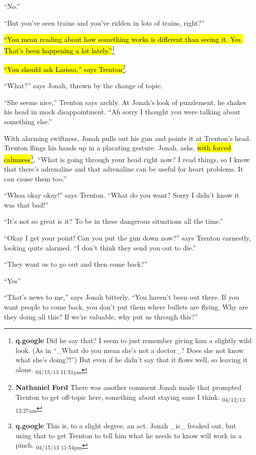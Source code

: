 ``No.''

``But you've seen trains and you've ridden in lots of trains, right?''

\hl{``You mean reading about how something works is different than seeing it.  Yes.  That's been happening a lot lately.''}\footnote{\textbf{q.google }Did he say that?  I seem to just remember giving him a slightly wild look.  (As in ``\_What do you mean she's not a doctor\_?  Does she not know what she's doing?!'')   But even if he didn't say that it flows well, so leaving it alone. \textsubscript{04/15/13 11:51pm}}

\hl{``You should ask Larissa,'' says Trenton}\footnote{\textbf{Nathaniel Ford }There was another comment Jonah made that prompted Trenton to get off-topic here, something about staying sane I think. \textsubscript{04/12/13 12:27am}}.

``What?'' says Jonah, thrown by the change of topic.

``She seems nice,'' Trenton says archly.  At Jonah's look of puzzlement, he shakes his head in mock disappointment.  ``Ah sorry I thought you were talking about something else.''



With alarming swiftness, Jonah pulls out his gun and points it at Trenton's head.  Trenton flings his hands up in a placating gesture.  Jonah, asks, \hl{with forced calmness}\footnote{\textbf{q.google }This is, to a slight degree, an act.  Jonah \_is\_ freaked out, but using that to get Trenton to tell him what he needs to know will work in a pinch. \textsubscript{04/15/13 11:54pm}}, ``What is going through your head right now?  I read things, so I know that there's adrenaline and that adrenaline can be useful for heart problems.  It can cause them too.''

``Whoa okay okay!'' says Trenton. ``What do you want?  Sorry I didn't know it was that bad!''

``It's not so great is it?  To be in these dangerous situations all the time.''

``Okay I get your point!  Can you put the gun down now?'' says Trenton earnestly, looking quite alarmed.  ``I don't think they send you out to die.''

``They want us to go out and then come back?''

``Yes''

``That's news to me,'' says Jonah bitterly.  ``You haven't been out there.  If you want people to come back, you don't put them where bullets are flying.  Why are they doing all this?  If we're valuable, why put us through this?''

